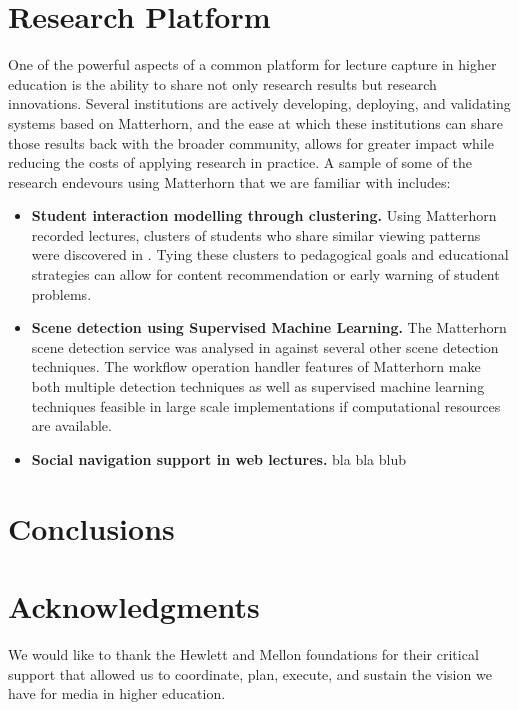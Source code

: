 \documentclass{sig-alternate}
\begin{document}
\section{Research Platform}
One of the powerful aspects of a common platform for lecture capture in higher education is the ability to share not only research results but research innovations.  Several institutions are actively developing, deploying, and validating systems based on Matterhorn, and the ease at which these institutions can share those results back with the broader community, allows for greater impact while reducing the costs of applying research in practice.
A sample of some of the research endevours using Matterhorn that we are familiar with includes:
\begin{itemize}
\item \textbf{Student interaction modelling through clustering.}   Using Matterhorn recorded lectures, clusters of students who share similar viewing patterns were discovered in \cite{Brooks2010}.  Tying these clusters to pedagogical goals and educational strategies can allow for content recommendation or early warning of student problems.
\item \textbf{Scene detection using Supervised Machine Learning.}  The Matterhorn scene detection service was analysed in \cite{Johnston2011} against several other scene detection techniques.  The workflow operation handler features of Matterhorn make both multiple detection techniques as well as supervised machine learning techniques feasible in large scale implementations if computational resources are available.
\item \textbf{Social navigation support in web lectures.} bla bla blub \cite{KMV09} \cite{Ketterl:2010:USN:1912600.1912699}
\end{itemize}

\section{Conclusions}

\section{Acknowledgments}
We would like to thank the Hewlett and Mellon foundations for their critical support that allowed us to coordinate, plan, execute, and sustain the vision we have for media in higher education.
\end{document}
